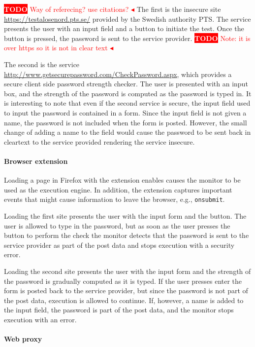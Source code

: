 \documentclass{llncs}
\newcommand{\todo}[1]{\colorbox{red}{\textcolor{white}{\sffamily\bfseries\scriptsize TODO}} \textcolor{red}{#1} \textcolor{red}{$\blacktriangleleft$}}
\begin{document}
\todo{Way of referecing? use citations?}
The first is the insecure site \url{https://testalosenord.pts.se/} provided by
the Swedish authority PTS. The service presents the user with an input field
and a button to initiate the test. Once the button is pressed, the
password is sent to the service provider.
\todo{Note: it is over https so it is not in clear text}

The second is the service
\url{http://www.getsecurepassword.com/CheckPassword.aspx}, which provides a
secure client side password strength checker. The user is presented with an
input box, and the strength of the password is computed as the password
is typed in.
%
It is interesting to note that even if the second service is secure, the input
field used to input the password is contained in a form. Since the input field
is not given a name, the password is not included when the form is posted.
However, the small change of adding a name to the field would cause the
password to be sent back in cleartext to the service provided rendering the
service insecure.

\paragraph{Browser extension}
%
Loading a page in Firefox with the extension enables causes the monitor to be used
as the execution engine. In addition, the extension captures important events that
might cause information to leave the browser, e.g., \lstinline{onsubmit}. 

Loading the first site presents the user with the input form and the button. The user
is allowed to type in the password, but as soon as the user presses the button to perform
the check the monitor detects that the password is sent to the service provider
as part of the post data and stops execution with a security error.

Loading the second site presents the user with the input form and the strength of the password 
is gradually computed as it is typed. If the user presses enter the form is posted back to
the service provider, but since the password is not part of the post data, execution is
allowed to continue. If, however, a name is added to the input field, the password is part
of the post data, and the monitor stops execution with an error.


\paragraph{Web proxy}
\end{document}
